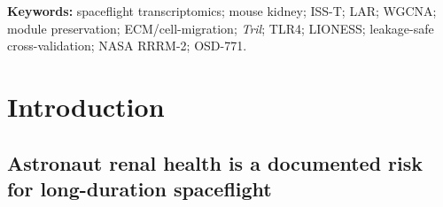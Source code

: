 \documentclass[11pt]{article}
\newcommand{\gene}[1]{\textit{#1}}
\begin{document}
\begin{abstract}
FDR-passing genes in any stratum and top-decile-overlap with LIONESS rankings at chance expectation, refuting broad topology rewiring as a detectable phenomenon at this cohort size. Sample-specific network features are demoted to a stratum-conditional benchmark; module-level activity shifts emerge as the dominant detectable signal. Hub-gene structure of grey60 (top hubs include \gene{Tril}, \gene{Itga9}, \gene{Fbn1}, \gene{S1pr3}, \gene{Cdh11}, \gene{Adam12}, \gene{Mmp14}) generates a testable mechanistic hypothesis: TLR4-pathway-dependent kidney ECM/cell-migration responses to terminal on-orbit spaceflight, which we predict will be attenuated or absent in TLR4-deficient C3H/HeJ kidney (RR-7 cohort, OSD-253) under the same flight conditions. Three causal explanations for the ISS-T-specific localization (acute on-orbit stress decaying during the 24-day LAR recovery; recovery-mediated reversal of an arm-shared signal; on-orbit dissection / sample collection differences from the LAR earth-dissection protocol) are not adjudicated by this dataset and are discussed explicitly. We propose grey60 as a candidate biomarker of terminal-flight ECM remodeling in C57BL/6N kidney and provide an open-source, pre-registered, multi-method framework as a template for honest small-cohort spaceflight network transcriptomics.
\end{abstract}

\vspace{0.3em}
\noindent\textbf{Keywords:} spaceflight transcriptomics; mouse kidney; ISS-T; LAR; WGCNA; module preservation; ECM/cell-migration; \emph{Tril}; TLR4; LIONESS; leakage-safe cross-validation; NASA RRRM-2; OSD-771.

\clearpage
\tableofcontents
\clearpage

\section{Introduction}

\subsection{Astronaut renal health is a documented risk for long-duration spaceflight}
\end{document}
